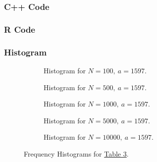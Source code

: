 \documentclass[10pt]{article}
\begin{document}
\subsubsection{C++ Code}


\pagebreak

\subsubsection{R Code}


\pagebreak

\enlargethispage*{1000pt}
\subsubsection{Histogram}
\begin{figure}[H]
	\centering
	\begin{subfigure}{0.5\textwidth}
		\centering
		\caption{Histogram for $N = 100,\:a = 1597$.}
		\label{fig:q2_f1_a}
	\end{subfigure}%
	\begin{subfigure}{0.5\textwidth}
		\centering
		\caption{Histogram for $N = 500,\:a = 1597$.}
		\label{fig:q2_f1_b}
	\end{subfigure}
	\begin{subfigure}{0.5\textwidth}
		\centering
		\caption{Histogram for $N = 1000,\:a = 1597$.}
		\label{fig:q2_f1_c}
	\end{subfigure}%
	\begin{subfigure}{0.5\textwidth}
		\centering
		\caption{Histogram for $N = 5000,\:a = 1597$.}
		\label{fig:q2_f1_d}
	\end{subfigure}
	\begin{subfigure}{0.5\textwidth}
		\centering
		\caption{Histogram for $N = 10000,\:a = 1597$.}
		\label{fig:q2_f1_e}
	\end{subfigure}
	\caption{Frequency Histograms for \hyperref[tab:q2_seq1]{Table 3}.}
	\label{fig:q2_f1}
\end{figure}
\end{document}
